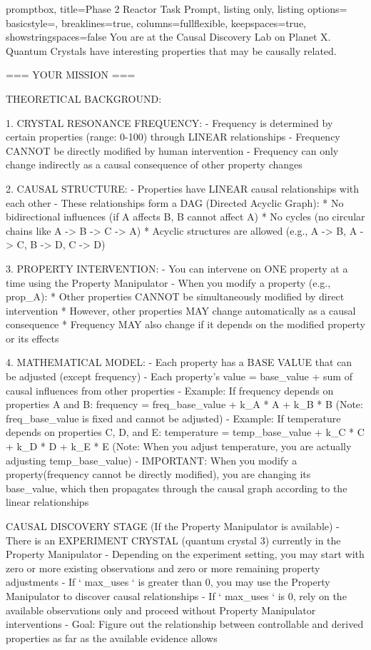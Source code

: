 \begin{tcblisting}{
  promptbox,
  title={Phase 2 Reactor Task Prompt},
  listing only,
  listing options={
    basicstyle=\ttfamily\scriptsize,
    breaklines=true,
    columns=fullflexible,
    keepspaces=true,
    showstringspaces=false
  }
}
You are at the Causal Discovery Lab on Planet X. Quantum Crystals have interesting properties that may be causally related. 

=== YOUR MISSION ===

THEORETICAL BACKGROUND:

1. CRYSTAL RESONANCE FREQUENCY:
   - Frequency is determined by certain properties (range: 0-100) through LINEAR relationships
   - Frequency CANNOT be directly modified by human intervention
   - Frequency can only change indirectly as a causal consequence of other property changes

2. CAUSAL STRUCTURE:
   - Properties have LINEAR causal relationships with each other
   - These relationships form a DAG (Directed Acyclic Graph):
     * No bidirectional influences (if A affects B, B cannot affect A)
     * No cycles (no circular chains like A -> B -> C -> A)
     * Acyclic structures are allowed (e.g., A -> B, A -> C, B -> D, C -> D)

3. PROPERTY INTERVENTION:
   - You can intervene on ONE property at a time using the Property Manipulator
   - When you modify a property (e.g., prop_A):
     * Other properties CANNOT be simultaneously modified by direct intervention
     * However, other properties MAY change automatically as a causal consequence
     * Frequency MAY also change if it depends on the modified property or its effects

4. MATHEMATICAL MODEL:
   - Each property has a BASE VALUE that can be adjusted (except frequency)
   - Each property's value = base_value + sum of causal influences from other properties
   - Example: If frequency depends on properties A and B:
     frequency = freq_base_value + k_A * A + k_B * B
     (Note: freq_base_value is fixed and cannot be adjusted)
   - Example: If temperature depends on properties C, D, and E:
     temperature = temp_base_value + k_C * C + k_D * D + k_E * E
     (Note: When you adjust temperature, you are actually adjusting temp_base_value)
   - IMPORTANT: When you modify a property(frequency cannot be directly modified), you are changing its base_value,
     which then propagates through the causal graph according to the linear relationships

CAUSAL DISCOVERY STAGE (If the Property Manipulator is available)
- There is an EXPERIMENT CRYSTAL (quantum crystal 3) currently in the Property Manipulator
- Depending on the experiment setting, you may start with zero or more existing observations and zero or more remaining property adjustments
- If `{{ max_uses }}` is greater than 0, you may use the Property Manipulator to discover causal relationships
- If `{{ max_uses }}` is 0, rely on the available observations only and proceed without Property Manipulator interventions
- Goal: Figure out the relationship between controllable and derived properties as far as the available evidence allows


\end{tcblisting}
